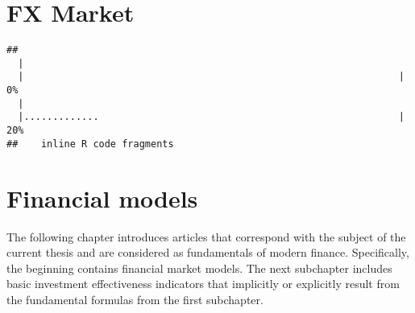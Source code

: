 \documentclass{pracamgr_wne}\usepackage[]{graphicx}\usepackage[]{color}
\makeatletter
\newenvironment{kframe}{%
 \def\at@end@of@kframe{}%
 \ifinner\ifhmode%
  \def\at@end@of@kframe{\end{minipage}}%
  \begin{minipage}{\columnwidth}%
 \fi\fi%
 \def\FrameCommand##1{\hskip\@totalleftmargin \hskip-\fboxsep
 \colorbox{shadecolor}{##1}\hskip-\fboxsep
     \hskip-\linewidth \hskip-\@totalleftmargin \hskip\columnwidth}%
 \MakeFramed {\advance\hsize-\width
   \@totalleftmargin\z@ \linewidth\hsize
   \@setminipage}}%
 {\par\unskip\endMakeFramed%
 \at@end@of@kframe}
\newenvironment{knitrout}{}{} %
\makeatother
\begin{document}
% 


\chapter{FX Market}

\begin{knitrout}
\color{fgcolor}\begin{kframe}


{\ttfamily\noindent\itshape\color{messagecolor}{\#\# \\\#\# \\\#\# processing file: chapters/subchapters/1\_2\_FX\_Market\_Organization.Rnw}}\begin{verbatim}
## 
  |                                                                       
  |                                                                 |   0%
  |                                                                       
  |.............                                                    |  20%
##    inline R code fragments
\end{verbatim}


{\ttfamily\noindent\itshape\color{messagecolor}{\#\# \\\#\# \\\#\# processing file: chapters/subchapters/../../masters\_thesis.Rnw}}

{\ttfamily\noindent\itshape\color{messagecolor}{\#\# Quitting from lines 2-24 (chapters/subchapters/../../masters\_thesis.Rnw)}}

{\ttfamily\noindent\bfseries\color{errorcolor}{\#\# Error in parse\_block(g[-1], g[1], params.src): duplicate label 'r'}}\end{kframe}

\end{knitrout}



\chapter{Financial models}





The following chapter introduces articles that correspond with the subject of the current thesis and are considered as fundamentals of modern finance.
Specifically, the beginning contains financial market models. The next subchapter includes basic investment effectiveness indicators that implicitly or explicitly result from the fundamental formulas from the first subchapter.
\end{document}

